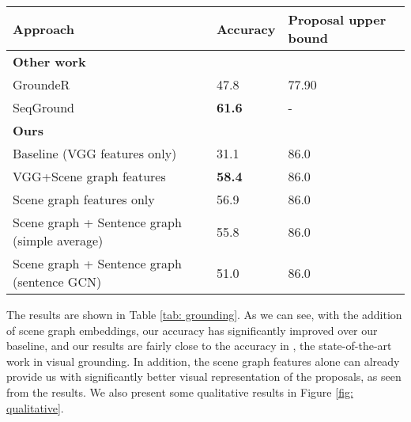 \begin{table*}[t]
\centering
\begin{tabular}{lll} 
\hline
\textbf{Approach}                             & \textbf{Accuracy}  & \textbf{Proposal upper bound}   \\ 
\hline
\textbf{Other work}                           &                    &                                 \\
GroundeR \cite{rohrbach2016grounding}                                      & 47.8               & 77.90                           \\
SeqGround \cite{dogan2019neural}                                    & \textbf{61.6 }     & -                             \\
\hline
\textbf{Ours}                                 &                    &                                 \\
Baseline (VGG features only)                  & 31.1               & 86.0                            \\
VGG+Scene graph features                      & \textbf{58.4 }     & 86.0                            \\
Scene graph features only                     & 56.9               & 86.0                            \\
Scene graph + Sentence graph (simple average) & 55.8               & 86.0                            \\
Scene graph + Sentence graph (sentence GCN)   &51.0                    & 86.0                            \\
\hline
\end{tabular}
\caption{Phrase grounding accuracy (in \%) on Flickr30k Entities test set with comparison to state-of-the-art results. The proposal upper bound is the proportion of correct bounding boxes (overlaps with groundtruth with IoU $>$ 0.5) among the proposals.}
\label{tab: grounding}
\end{table*}

The results are shown in Table \ref{tab: grounding}. As we can see, with the addition of scene graph embeddings, our accuracy has significantly improved over our baseline, and our results are fairly close to the accuracy in \cite{dogan2019neural}, the state-of-the-art work in visual grounding. In addition, the scene graph features alone can already provide us with significantly better visual representation of the proposals, as seen from the results. We also present some qualitative results in Figure \ref{fig: qualitative}. 

